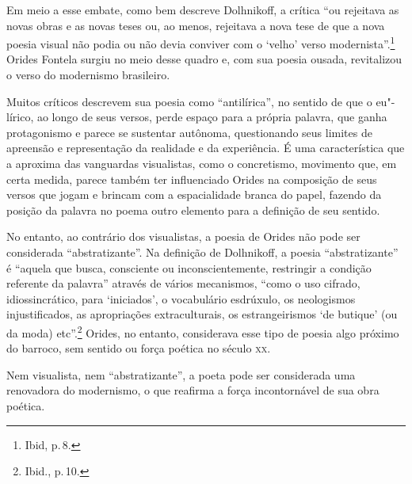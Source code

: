 Em meio a esse embate, como bem descreve Dolhnikoff, a crítica ``ou rejeitava as novas obras e as novas teses ou, ao menos, rejeitava a nova tese de que a nova poesia visual não podia ou não devia conviver com o `velho' verso modernista''.\footnote{Ibid, p.\,8.} Orides Fontela surgiu no meio desse quadro e, com sua poesia ousada, revitalizou o verso do modernismo brasileiro. 

Muitos críticos descrevem sua poesia como ``antilírica'', no sentido de que o eu"-lírico, ao longo de seus versos, perde espaço para a própria palavra, que ganha protagonismo e parece se sustentar autônoma, questionando seus limites de apreensão e representação da realidade e da experiência. É uma característica que a aproxima das vanguardas visualistas, como o concretismo, movimento que, em certa medida, parece também ter influenciado Orides na composição de seus versos que jogam e brincam com a espacialidade branca do papel, fazendo da posição da palavra no poema outro elemento para a definição de seu sentido.

No entanto, ao contrário dos visualistas, a poesia de Orides não pode ser considerada ``abstratizante''. Na definição de Dolhnikoff, a poesia ``abstratizante'' é ``aquela que busca, consciente ou inconscientemente, restringir a condição referente da palavra'' através de vários mecanismos, ``como o uso cifrado, idiossincrático, para
`iniciados', o vocabulário esdrúxulo, os neologismos injustiﬁcados, as
apropriações extraculturais, os estrangeirismos `de butique' (ou da
moda) etc''.\footnote{Ibid., p.\,10.} Orides, no entanto, considerava esse tipo de poesia algo próximo do barroco, sem sentido ou força poética no século \textsc{xx}.

Nem visualista, nem ``abstratizante'', a poeta pode ser considerada uma renovadora do modernismo, o que reafirma a força incontornável de sua obra poética.